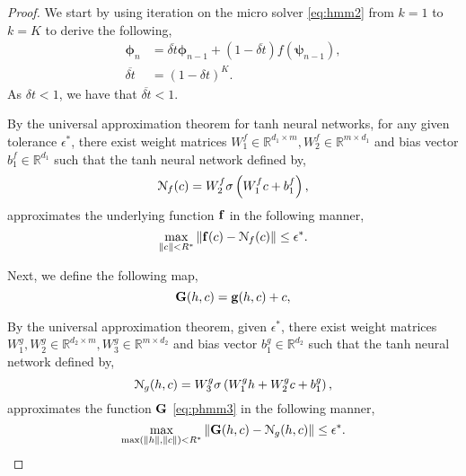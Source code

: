 \documentclass{article} \usepackage{iclr2022_conference,times}
\newcommand{\bc}{{\boldsymbol{\psi}}}
\newcommand{\bh}{{\boldsymbol{\phi}}}
\newcommand{\R}{{\mathbb R}}
\newcommand{\cN}{\EuScript{N}}
\newcommand{\bG}{{\bf G}}
\newcommand{\bif}{{\bf f}}
\newcommand{\bg}{{\bf g}}
\begin{document}
\begin{proof}
We start by using iteration on the micro solver \eqref{eq:hmm2} from $k=1$ to $k= K$ to derive the following, 
\begin{equation}
    \label{eq:phmm1}
    \begin{aligned}
    \bh_n &= \overline{\delta t} \bh_{n-1} + (1 - \overline{\delta t})f(\bc_{n-1}), \\
    \overline{\delta t}&= \left(1-\delta t\right)^K.
    \end{aligned}
\end{equation}
As $\delta t < 1$, we have that $\overline{\delta t} < 1$. 

By the universal approximation theorem for tanh neural networks, for any given tolerance $\epsilon^{\ast}$, there exist weight matrices $W^f_1 \in \R^{d_1 \times m}, W^f_2 \in \R^{m \times d_1}$ and bias vector $b^f_1 \in \R^{d_1}$ such that the tanh neural network defined by,
\begin{equation}
\label{eq:hmmnf}
\cN_f(c) = W^f_2\sigma\left(W^f_1c+ b^f_1 \right),
\end{equation}
approximates the underlying function $\bif$ in the following manner, 
\begin{equation}
    \label{eq:phmm2}
    \max\limits_{\|c\|< R^{\ast}} \|\bif(c) - \cN_f(c) \| \leq \epsilon^{\ast}.
\end{equation}

Next, we define the following map, 
\begin{equation}
\label{eq:phmm3}
\bG(h,c) = \bg(h,c) + c,
\end{equation}

By the universal approximation theorem, given 
$\epsilon^{\ast}$, there exist weight matrices $W^g_1,W^g_2 \in \R^{d_2 \times m}, W^g_3 \in \R^{m \times d_2}$ and bias vector $b^g_1 \in \R^{d_2}$ such that the tanh neural network defined by,
\begin{equation}
\label{eq:hmmng}
\cN_g(h,c) = W^g_3\sigma\left(W^g_1 h + W^g_2c+ b^g_1 \right),
\end{equation}
approximates the function $\bG$ \eqref{eq:phmm3} in the following manner, 
\begin{equation}
    \label{eq:phmm4}
    \max\limits_{\max(\|h\|,\|c\|)< R^{\ast}} \|\bG(h,c) - \cN_g(h,c) \| \leq \epsilon^{\ast}.
\end{equation}


\end{proof}
\end{document}
